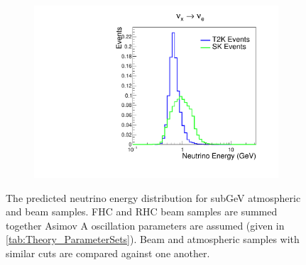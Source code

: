 \begin{figure}[h]
\begin{subfigure}[t]{0.49\textwidth}
    \includegraphics[width=\textwidth, trim={0mm 0mm 0mm 0mm}, clip,page=1]{Figures/Selections/NeutrinoEnergyDist_Comp_1Re1de_NuE.pdf}
  \end{subfigure}
  \caption{The predicted neutrino energy distribution for subGeV atmospheric and beam samples. FHC and RHC beam samples are summed together Asimov A oscillation parameters are assumed (given in \autoref{tab:Theory_ParameterSets}). Beam and atmospheric samples with similar cuts are compared against one another.}
  \label{fig:SelsAndSysts_NeutrinoEnergyComparison}
\end{figure}

